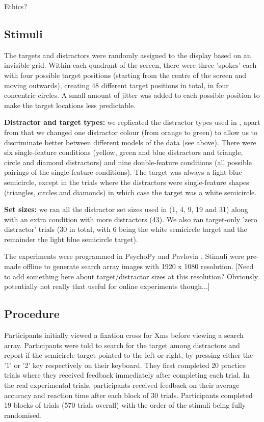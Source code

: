 \documentclass[smallextended, natbib]{svjour3}       %
\begin{document}
Ethics?

\subsection{Stimuli}

The targets and distractors were randomly assigned to the display based on an invisible grid. Within each quadrant of the screen, there were three 'spokes' each with four possible target positions (starting from the centre of the screen and moving outwards), creating 48 different target positions in total, in four concentric circles. A small amount of jitter was added to each possible position to make the target locations less predictable.

\textbf{Distractor and target types:} we replicated the distractor types used in \cite{buetti2019predicting}, apart from that we changed one distractor colour (from orange to green) to allow us to discriminate better between different models of the data (see above). There were six single-feature conditions (yellow, green and blue distractors and triangle, circle and diamond distractors) and nine double-feature conditions (all possible pairings of the single-feature conditions). The target was always a light blue semicircle, except in the trials where the distractors were single-feature shapes (triangles, circles and diamonds) in which case the target was a white semicircle.

\textbf{Set sizes:} we ran all the distractor set sizes used in \cite{buetti2019predicting} (1, 4, 9, 19 and 31) along with an extra condition with more distractors (43). We also ran target-only 'zero distractor' trials (30 in total, with 6 being the white semicircle target and the remainder the light blue semicircle target).

The experiments were programmed in PsychoPy and Pavlovia \cite{peirce2019psychopy2}. Stimuli were pre-made offline to generate search array images with 1920 x 1080 resolution. [Need to add something here about target/distractor sizes at this resolution? Obviously potentially not really that useful for online experiments though...]

\subsection{Procedure}

Participants initially viewed a fixation cross for Xms before viewing a search array. Participants were told to search for the target among distractors and report if the semicircle target pointed to the left or right, by pressing either the '1' or '2' key respectively on their keyboard. They first completed 20 practice trials  where they received feedback immediately after completing each trial. In the real experimental trials, participants received feedback on their average accuracy and reaction time after each block of 30 trials. Participants  completed 19 blocks of trials (570 trials overall) with the order of the stimuli being fully randomised.
 
\end{document}
